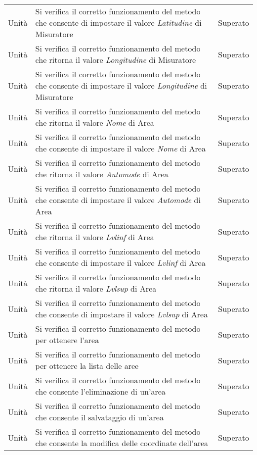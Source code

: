 \begin{center}
\begin{xltabular}{\linewidth}{|l|X|l|}
        Unità & Si verifica il corretto funzionamento del metodo che consente di impostare il valore \textit{Latitudine} di Misuratore & Superato\\
        Unità & Si verifica il corretto funzionamento del metodo che ritorna il valore \textit{Longitudine} di Misuratore & Superato\\
        Unità & Si verifica il corretto funzionamento del metodo che consente di impostare il valore \textit{Longitudine} di Misuratore & Superato\\
        Unità & Si verifica il corretto funzionamento del metodo che ritorna il valore \textit{Nome} di Area & Superato\\
        Unità & Si verifica il corretto funzionamento del metodo che consente di impostare il valore \textit{Nome} di Area & Superato\\
        Unità & Si verifica il corretto funzionamento del metodo che ritorna il valore \textit{Automode} di Area & Superato\\
        Unità & Si verifica il corretto funzionamento del metodo che consente di impostare il valore \textit{Automode} di Area & Superato\\
        Unità & Si verifica il corretto funzionamento del metodo che ritorna il valore \textit{Lvlinf} di Area & Superato\\
        Unità & Si verifica il corretto funzionamento del metodo che consente di impostare il valore \textit{Lvlinf} di Area & Superato\\
        Unità & Si verifica il corretto funzionamento del metodo che ritorna il valore \textit{Lvlsup} di Area & Superato\\
        Unità & Si verifica il corretto funzionamento del metodo che consente di impostare il valore \textit{Lvlsup} di Area & Superato\\
        Unità & Si verifica il corretto funzionamento del metodo per ottenere l'area & Superato\\
        Unità & Si verifica il corretto funzionamento del metodo per ottenere la lista delle aree & Superato\\
        Unità & Si verifica il corretto funzionamento del metodo che consente l'eliminazione di un'area & Superato\\
        Unità & Si verifica il corretto funzionamento del metodo che consente il salvataggio di un'area & Superato\\
        Unità & Si verifica il corretto funzionamento del metodo che consente la modifica delle coordinate dell'area & Superato\\

\end{xltabular}
\end{center}

